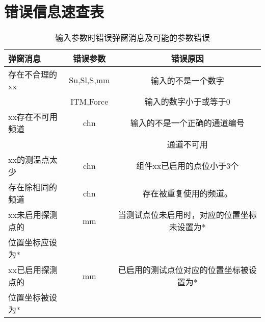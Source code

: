 \chapter{错误信息速查表\label{app:errorInfo}}


\begin{table}[htbp]
    \centering
    \caption{ 输入参数时错误弹窗消息及可能的参数错误 \label{tab:errorInfoNormalUserA}}
    \begin{tabular}{@{}lcc@{}}
        \toprule
        弹窗消息                        & 错误参数   & 错误原因                                    \\ \midrule
        存在不合理的xx                  & Su,Sl,S,mm & 输入的不是一个数字                          \\
                                        & ITM,Force  & 输入的数字小于或等于0                       \\
        xx存在不可用频道                & chn        & 输入的不是一个正确的通道编号                \\
                                        &            & 通道不可用                                  \\
        xx的测温点太少                  & chn        & 组件xx已启用的点位小于3个                   \\
        存在除相同的频道                & chn        & 存在被重复使用的频道。                      \\
        xx未启用探测点的 & mm         & 当测试点位未启用时，对应的位置坐标未设置为* \\
        位置坐标应设为*& & \\
        xx已启用探测点的 & mm         & 已启用的测试点位对应的位置坐标被设置为*     \\
        位置坐标被设为* & & \\
        \bottomrule
    \end{tabular}
\end{table}
